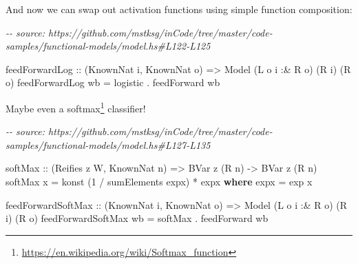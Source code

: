 \documentclass[]{article}
\newenvironment{Shaded}{}{}
\newcommand{\CommentTok}[1]{\textcolor[rgb]{0.38,0.63,0.69}{\textit{#1}}}
\newcommand{\DataTypeTok}[1]{\textcolor[rgb]{0.56,0.13,0.00}{#1}}
\newcommand{\DecValTok}[1]{\textcolor[rgb]{0.25,0.63,0.44}{#1}}
\newcommand{\FunctionTok}[1]{\textcolor[rgb]{0.02,0.16,0.49}{#1}}
\newcommand{\KeywordTok}[1]{\textcolor[rgb]{0.00,0.44,0.13}{\textbf{#1}}}
\newcommand{\NormalTok}[1]{#1}
\newcommand{\OperatorTok}[1]{\textcolor[rgb]{0.40,0.40,0.40}{#1}}
\newcommand{\OtherTok}[1]{\textcolor[rgb]{0.00,0.44,0.13}{#1}}
\renewcommand{\href}[2]{#2\footnote{\url{#1}}}
\begin{document}
And now we can swap out activation functions using simple function composition:

\begin{Shaded}
\begin{Highlighting}[]
\CommentTok{{-}{-} source: https://github.com/mstksg/inCode/tree/master/code{-}samples/functional{-}models/model.hs\#L122{-}L125}

\NormalTok{feedForwardLog\textquotesingle{}}
\OtherTok{    ::}\NormalTok{ (}\DataTypeTok{KnownNat}\NormalTok{ i, }\DataTypeTok{KnownNat}\NormalTok{ o)}
    \OtherTok{=\textgreater{}} \DataTypeTok{Model}\NormalTok{ (}\DataTypeTok{L}\NormalTok{ o i }\OperatorTok{:\&} \DataTypeTok{R}\NormalTok{ o) (}\DataTypeTok{R}\NormalTok{ i) (}\DataTypeTok{R}\NormalTok{ o)}
\NormalTok{feedForwardLog\textquotesingle{} wb }\OtherTok{=}\NormalTok{ logistic }\OperatorTok{.}\NormalTok{ feedForward wb}
\end{Highlighting}
\end{Shaded}

Maybe even a \href{https://en.wikipedia.org/wiki/Softmax_function}{softmax}
classifier!

\begin{Shaded}
\begin{Highlighting}[]
\CommentTok{{-}{-} source: https://github.com/mstksg/inCode/tree/master/code{-}samples/functional{-}models/model.hs\#L127{-}L135}

\OtherTok{softMax ::}\NormalTok{ (}\DataTypeTok{Reifies}\NormalTok{ z }\DataTypeTok{W}\NormalTok{, }\DataTypeTok{KnownNat}\NormalTok{ n) }\OtherTok{=\textgreater{}} \DataTypeTok{BVar}\NormalTok{ z (}\DataTypeTok{R}\NormalTok{ n) }\OtherTok{{-}\textgreater{}} \DataTypeTok{BVar}\NormalTok{ z (}\DataTypeTok{R}\NormalTok{ n)}
\NormalTok{softMax x }\OtherTok{=}\NormalTok{ konst (}\DecValTok{1} \OperatorTok{/}\NormalTok{ sumElements expx) }\OperatorTok{*}\NormalTok{ expx}
  \KeywordTok{where}
\NormalTok{    expx }\OtherTok{=} \FunctionTok{exp}\NormalTok{ x}

\NormalTok{feedForwardSoftMax}
\OtherTok{    ::}\NormalTok{ (}\DataTypeTok{KnownNat}\NormalTok{ i, }\DataTypeTok{KnownNat}\NormalTok{ o)}
    \OtherTok{=\textgreater{}} \DataTypeTok{Model}\NormalTok{ (}\DataTypeTok{L}\NormalTok{ o i }\OperatorTok{:\&} \DataTypeTok{R}\NormalTok{ o) (}\DataTypeTok{R}\NormalTok{ i) (}\DataTypeTok{R}\NormalTok{ o)}
\NormalTok{feedForwardSoftMax wb }\OtherTok{=}\NormalTok{ softMax }\OperatorTok{.}\NormalTok{ feedForward wb}
\end{Highlighting}
\end{Shaded}
\end{document}
